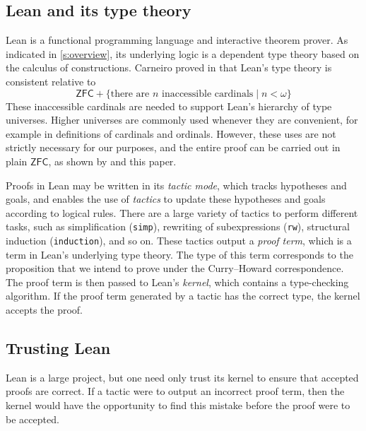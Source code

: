 \subsection{Lean and its type theory}

Lean \cite{lean} is a functional programming language and interactive theorem prover.
As indicated in \cref{s:overview}, its underlying logic is a dependent type theory based on the calculus of constructions.
Carneiro proved in \cite{leantt} that Lean's type theory is consistent relative to
\[ \mathsf{ZFC} + \{ \text{there are } n \text{ inaccessible cardinals} \mid n < \omega \} \]
These inaccessible cardinals are needed to support Lean's hierarchy of type universes.
Higher universes are commonly used whenever they are convenient, for example in definitions of cardinals and ordinals.
However, these uses are not strictly necessary for our purposes, and the entire proof can be carried out in plain \( \mathsf{ZFC} \), as shown by \cite{holmes2023nf} and this paper.

Proofs in Lean may be written in its \emph{tactic mode}, which tracks hypotheses and goals, and enables the use of \emph{tactics} to update these hypotheses and goals according to logical rules.
There are a large variety of tactics to perform different tasks, such as simplification (\texttt{simp}), rewriting of subexpressions (\texttt{rw}), structural induction (\texttt{induction}), and so on.
These tactics output a \emph{proof term}, which is a term in Lean's underlying type theory.
The type of this term corresponds to the proposition that we intend to prove under the Curry--Howard correspondence.
The proof term is then passed to Lean's \emph{kernel}, which contains a type-checking algorithm.
If the proof term generated by a tactic has the correct type, the kernel accepts the proof.

\subsection{Trusting Lean}


Lean is a large project, but one need only trust its kernel to ensure that accepted proofs are correct.
If a tactic were to output an incorrect proof term, then the kernel would have the opportunity to find this mistake before the proof were to be accepted.

